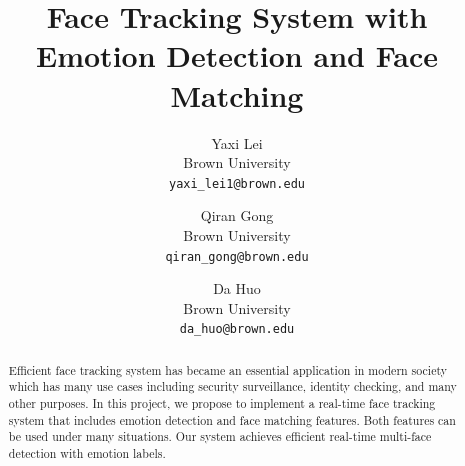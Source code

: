 \documentclass[10pt,twocolumn,letterpaper]{article}
\begin{document}
\title{Face Tracking System with Emotion Detection and Face Matching}

\author{Yaxi Lei\\
Brown University\\
{\tt\small yaxi\_lei1@brown.edu}
\and
Qiran Gong\\
Brown University\\
{\tt\small qiran\_gong@brown.edu}
\and
Da Huo\\
Brown University\\
{\tt\small da\_huo@brown.edu}
}

\maketitle

\begin{abstract}
   Efficient face tracking system has became an essential application in modern society which has many use cases including security surveillance, identity checking, and many other purposes. In this project, we propose to implement a real-time face tracking system that includes emotion detection and face matching features. Both features can be used under many situations. Our system achieves efficient real-time multi-face detection with emotion labels. 
\end{abstract}

\end{document}
